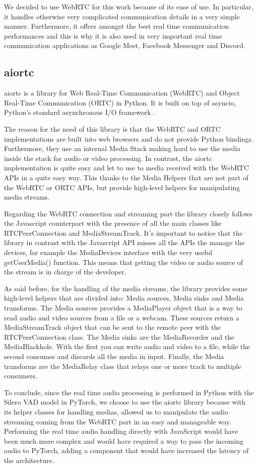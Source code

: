 \documentclass[../main.tex]{subfiles}
\begin{document}
We decided to use WebRTC for this work because of its ease of use. In particular, it handles otherwise very complicated communication details in a very simple manner. Furthermore, it offers amongst the best real time communication performances and this is why it is also used in very important real time communication applications as Google Meet, Facebook Messenger and Discord.

\subsection{aiortc}

aiortc is a library for Web Real-Time Communication (WebRTC) and Object Real-Time Communication (ORTC) in Python. It is built on top of asyncio, Python's standard asynchronous I/O framework \cite{aiortc}.

The reason for the need of this library is that the WebRTC and ORTC implementations are built into web browsers and do not provide Python bindings. Furthermore, they use an internal Media Stack making hard to use the media inside the stack for audio or video processing. In contrast, the aiortc implementation is quite easy and let to use to media received with the WebRTC APIs in a quite easy way. This thanks to the Media Helpers that are not part of the WebRTC or ORTC APIs, but provide high-level helpers for manipulating media streams.  

Regarding the WebRTC connection and streaming part the library closely follows the Javascript counterpart with the presence of all the main classes like RTCPeerConnection and MediaStreamTrack. It's important to notice that the library in contrast with the Javascript API misses all the APIs the manage the devices, for example the MediaDevices interface with the very useful getUserMedia() function. This means that getting the video or audio source of the stream is in charge of the developer. 

As said before, for the handling of the media streams, the library provides some high-level helpers that are divided into: Media sources, Media sinks and Media transforms. The Media sources provides a MediaPlayer object that is a way to read audio and video sources from a file or a webcam. These sources return a MediaStreamTrack object that can be sent to the remote peer with the RTCPeerConnection class. The Media sinks are the MediaRecorder and the MediaBlackhole. With the first you can write audio and video to a file, while the second consumes and discards all the media in input. Finally, the Media transforms are the MediaRelay class that relays one or more track to multiple consumers. 

To conclude, since the real time audio processing is performed in Python with the Silero VAD model in PyTorch, we choose to use the aiortc library because with its helper classes for handling medias, allowed us to manipulate the audio streaming coming from the WebRTC part in an easy and manageable way. Performing the real time audio handling directly with JavaScript would have been much more complex and would have required a way to pass the incoming audio to PyTorch, adding a component that would have increased the latency of the architecture. 
\end{document}
